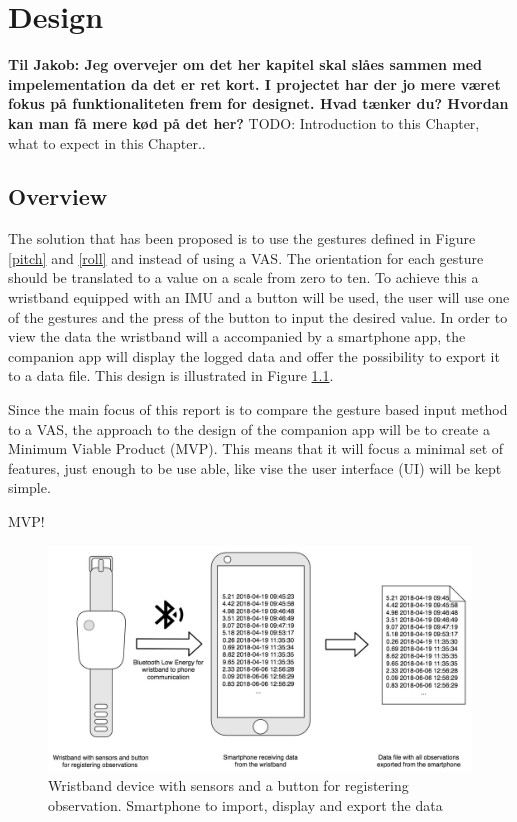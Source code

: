 \chapter{Design}
\textbf{Til Jakob: Jeg overvejer om det her kapitel skal slåes sammen med impelementation da det er ret kort. I projectet har der jo mere været fokus på funktionaliteten frem for designet. Hvad tænker du? Hvordan kan man få mere kød på det her?}
TODO: Introduction to this Chapter, what to expect in this Chapter..


\section{Overview}
The solution that has been proposed is to use the gestures defined in Figure \ref{pitch} and \ref{roll} and instead of using a VAS. The orientation for each gesture should be translated to a value on a scale from zero to ten. To achieve this a wristband equipped with an IMU and a button will be used, the user will use one of the gestures and the press of the button to input the desired value. In order to view the data the wristband will a accompanied by a smartphone app, the companion app will display the logged data and offer the possibility to export it to a data file. This design is illustrated in Figure \ref{design_overview}.

Since the main focus of this report is to compare the gesture based input method to a VAS, the approach to the design of the companion app will be to create a Minimum Viable Product (MVP)\cite{mvp}. This means that it will focus a minimal set of features, just enough to be use able, like vise the user interface (UI) will be kept simple.

MVP!

\begin{figure}[h]
    \centering
    \includegraphics[width=1\textwidth]{figures/design_overview.png}
    \caption{Wristband device with sensors and a button for registering observation. Smartphone to import, display and export the data}
    \label{design_overview}
\end{figure}


